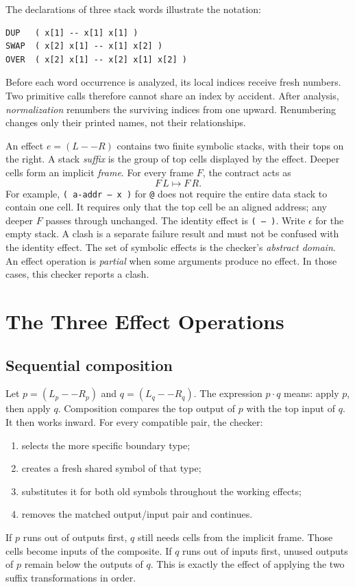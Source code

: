 \documentclass[11pt,a4paper]{article}
\newcommand{\effect}[1]{\mbox{\texttt{#1}}}
\newcommand{\seq}{\mathbin{\cdot}}
\begin{document}
\begin{samepage}
The declarations of three stack words illustrate the notation:
\begin{verbatim}
DUP   ( x[1] -- x[1] x[1] )
SWAP  ( x[2] x[1] -- x[1] x[2] )
OVER  ( x[2] x[1] -- x[2] x[1] x[2] )
\end{verbatim}
Before each word occurrence is analyzed, its local indices receive fresh
numbers.  Two primitive calls therefore cannot share an index by accident.
After analysis, \emph{normalization} renumbers the surviving indices from one
upward.  Renumbering changes only their printed names, not their relationships.
\end{samepage}

An effect $e=(L--R)$ contains two finite symbolic stacks, with their tops on
the right.  A stack \emph{suffix} is the group of top cells displayed by the
effect.  Deeper cells form an implicit \emph{frame}.  For every frame $F$, the
contract acts as
\[
                  F\,L \longmapsto F\,R.
\]
For example, \effect{( a-addr -- x )} for \texttt{@} does not require the
entire data stack to contain one cell.  It requires only that the top cell be
an aligned address; any deeper $F$ passes through unchanged.  The identity
effect is \effect{( -- )}.  Write $\epsilon$ for the empty stack.  A clash is
a separate failure result and must not be confused with the identity effect.
The set of symbolic effects is the checker's \emph{abstract domain}.  An
effect operation is \emph{partial} when some arguments produce no effect.  In
those cases, this checker reports a clash.

\section{The Three Effect Operations}
\label{sec:operations}

\subsection{Sequential composition}

Let $p=(L_p--R_p)$ and $q=(L_q--R_q)$.  The expression $p\seq q$ means: apply
$p$, then apply $q$.  Composition compares the top output of $p$ with the top
input of $q$.  It then works inward.
For every compatible pair, the checker:
\begin{enumerate}
  \item selects the more specific boundary type;
  \item creates a fresh shared symbol of that type;
  \item substitutes it for both old symbols throughout the working effects;
  \item removes the matched output/input pair and continues.
\end{enumerate}
If $p$ runs out of outputs first, $q$ still needs cells from the implicit
frame.  Those cells become inputs of the composite.  If $q$ runs out of inputs
first, unused outputs of $p$ remain below the outputs of $q$.  This is exactly
the effect of applying the two suffix transformations in order.
\end{document}
